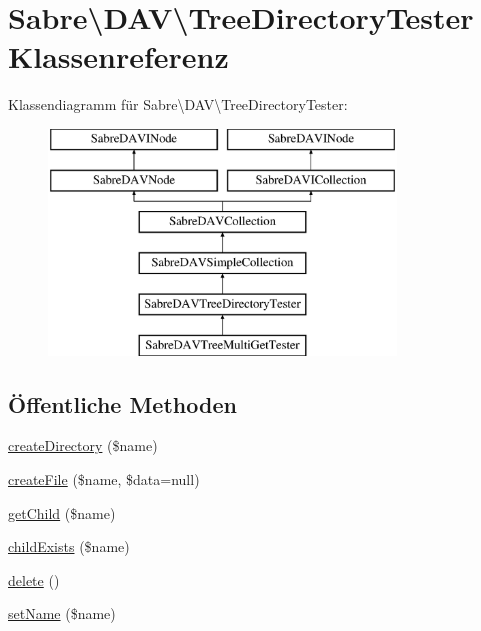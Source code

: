 \hypertarget{class_sabre_1_1_d_a_v_1_1_tree_directory_tester}{}\section{Sabre\textbackslash{}D\+AV\textbackslash{}Tree\+Directory\+Tester Klassenreferenz}
\label{class_sabre_1_1_d_a_v_1_1_tree_directory_tester}
Klassendiagramm für Sabre\textbackslash{}D\+AV\textbackslash{}Tree\+Directory\+Tester\+:\begin{figure}[H]
\begin{center}
\leavevmode
\includegraphics[height=6.000000cm]{class_sabre_1_1_d_a_v_1_1_tree_directory_tester}
\end{center}
\end{figure}
\subsection*{Öffentliche Methoden}
\begin{DoxyCompactItemize}
\item 
\mbox{\hyperlink{class_sabre_1_1_d_a_v_1_1_tree_directory_tester_ad78897c04381c71772aab8c6d16adfea}{create\+Directory}} (\$name)
\item 
\mbox{\hyperlink{class_sabre_1_1_d_a_v_1_1_tree_directory_tester_a5da227a7e00590c41d809acc7131e455}{create\+File}} (\$name, \$data=null)
\item 
\mbox{\hyperlink{class_sabre_1_1_d_a_v_1_1_tree_directory_tester_af843be3a9a6ffd2a67572e8ab4a9c261}{get\+Child}} (\$name)
\item 
\mbox{\hyperlink{class_sabre_1_1_d_a_v_1_1_tree_directory_tester_aa220332b01cdebf6cfdbfb23a4808849}{child\+Exists}} (\$name)
\item 
\mbox{\hyperlink{class_sabre_1_1_d_a_v_1_1_tree_directory_tester_a08e38781016fb278bdb23e7f8efab7cd}{delete}} ()
\item 
\mbox{\hyperlink{class_sabre_1_1_d_a_v_1_1_tree_directory_tester_ab53a32b6d72da045de6896915167ba8a}{set\+Name}} (\$name)
\end{DoxyCompactItemize}
